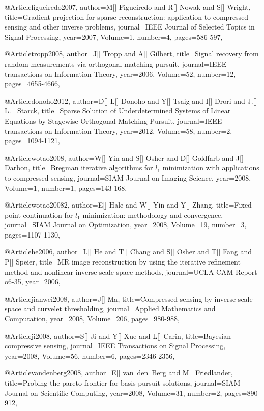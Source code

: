 {@Article{figueiredo2007,
  author={M[] Figueiredo and R[] Nowak and S[] Wright},
  title={Gradient projection for sparse reconstruction: application to compressed sensing and other inverse problems},
  journal={IEEE Journal of Selected Topics in Signal Processing},
  year=2007,
  Volume=1,
  number=4,
  pages={586-597},
}


@Article{tropp2008,
  author={J[] Tropp and A[] Gilbert},
  title={Signal recovery from random measurements via orthogonal matching pursuit},
  journal={IEEE transactions on Information Theory},
  year=2006,
  Volume=52,
  number=12,
  pages={4655-4666},
}


@Article{donoho2012,
  author={D[] L[] Donoho and Y[] Tsaig and I[] Drori and J.[]-L.[] Starck},
  title={Sparse Solution of Underdetermined Systems of Linear Equations by Stagewise Orthogonal Matching Pursuit},
  journal={IEEE transactions on Information Theory},
  year=2012,
  Volume=58,
  number=2,
  pages={1094-1121},
}

@Article{wotao2008,
  author={W[] Yin and S[] Osher and D[] Goldfarb and J[] Darbon},
  title={Bregman iterative algorithms for $l_1$ minimization with applications to compressed sensing},
  journal={SIAM Journal on Imaging Science},
  year=2008,
  Volume=1,
  number=1,
  pages={143-168},
}

@Article{wotao20082,
  author={E[] Hale and W[] Yin and Y[] Zhang},
  title={Fixed-point continuation for $l_1$-minimization: methodology and convergence},
  journal={SIAM Journal on Optimization},
  year=2008,
  Volume=19,
  number=3,
  pages={1107-1130},
}

@Article{he2006,
  author={L[] He and T[] Chang and S[] Osher and T[] Fang and P[] Speier},
  title={MR image reconstruction by using the iterative refinement method and nonlinear inverse scale space methods},
  journal={UCLA CAM Report o6-35},
  year=2006,
}

@Article{jianwei2008,
  author={J[] Ma},
  title={Compressed sensing by inverse scale space and curvelet thresholding},
  journal={Applied Mathematics and Computation},
  year=2008,
  Volume=206,
  pages={980-988},
}

@Article{ji2008,
  author={S[] Ji and Y[] Xue and L[] Carin},
  title={Bayesian compressive sensing},
  journal={IEEE Transactions on Signal Processing},
  year=2008,
  Volume=56,
  number=6,
  pages={2346-2356},
}

@Article{vandenberg2008,
  author={E[] van~den~Berg and M[] Friedlander},
  title={Probing the pareto frontier for basis pursuit solutions},
  journal={SIAM Journal on Scientific Computing},
  year=2008,
  Volume=31,
  number=2,
  pages={890-912},
}

}
